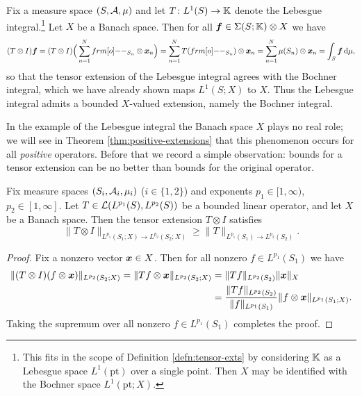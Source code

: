 \begin{example}
  Fix a measure space $(S,\mathcal{A},\mu)$ and let $T \colon L^1(S) \rightarrow \mathbb{K}$ denote the Lebesgue integral.\footnote{This fits in the scope of Definition \ref{defn:tensor-exts} by considering $\mathbb{K}$ as a Lebesgue space $L^1(\mathrm{pt})$ over a single point. Then $X$ may be identified with the Bochner space $L^1(\mathrm{pt};X)$.}
  Let $X$ be a Banach space.
  Then for all $\bm{f} \in \Sigma(S;\mathbb{K}) \otimes X$ we have
  \begin{equation*}
    (T \otimes I)\mb{f} = (T \otimes I)\Big(\sum_{n=1}^N \1_{S_n} \otimes \mb{x}_n \Big) = \sum_{n=1}^N T(\1_{S_n}) \otimes \mb{x}_n = \sum_{n=1}^N \mu(S_n) \otimes \mb{x}_n = \int_S \mb{f} \, \dd\mu,
  \end{equation*}
  so that the tensor extension of the Lebesgue integral agrees with the Bochner integral, which we have already shown maps $L^1(S;X)$ to $X$.
  Thus the Lebesgue integral admits a bounded $X$-valued extension, namely the Bochner integral.
\end{example}

In the example of the Lebesgue integral the Banach space $X$ plays no real role; we will see in Theorem \ref{thm:positive-extensions} that this phenomenon occurs for all \emph{positive} operators.
Before that we record a simple observation: bounds for a tensor extension can be no better than bounds for the original operator.

\begin{prop}\label{prop:lb-ext}
  Fix measure spaces $(S_i,\mathcal{A}_i,\mu_i)$ ($i \in \{1,2\}$) and exponents $p_1 \in [1,\infty)$, $p_2 \in [1,\infty]$.
  Let $T \in \mathcal{L}(L^{p_1}(S),L^{p_2}(S))$ be a bounded linear operator, and let $X$ be a Banach space.
  Then the tensor extension $T \otimes I$ satisfies
  \begin{equation*}
    \|T \otimes I\|_{L^{p_1}(S_1;X) \to L^{p_2}(S_2;X)} \geq \|T\|_{L^{p_1}(S_1) \to L^{p_2}(S_2)}.
  \end{equation*}
\end{prop}

\begin{proof}
  Fix a nonzero vector $\bm{x} \in X$.
  Then for all nonzero $f \in L^{p_1}(S_1)$ we have
  \begin{equation*}
    \begin{aligned}
      \|(T \otimes I)(f \otimes \bm{x})\|_{L^{p_2}(S_2;X)} = \|Tf \otimes \bm{x}\|_{L^{p_2}(S_2;X)} &= \|Tf\|_{L^{p_2}(S_2)} \|\bm{x}\|_X \\
      &= \frac{\|Tf\|_{L^{p_2}(S_2)}}{\|f\|_{L^{p_1}(S_1)}} \|f \otimes \bm{x}\|_{L^{p_1}(S_1;X)}.
    \end{aligned}
  \end{equation*}
  Taking the supremum over all nonzero $f \in L^{p_1}(S_1)$ completes the proof.
\end{proof}

